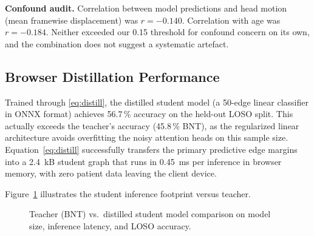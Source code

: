 \documentclass[conference]{IEEEtran}
\begin{document}
\textbf{Confound audit.} Correlation between model predictions and head
motion (mean framewise displacement) was $r = -0.140$. Correlation
with age was $r = -0.184$. Neither exceeded our 0.15 threshold for
confound concern on its own, and the combination does not suggest a
systematic artefact.

\subsection{Browser Distillation Performance}

Trained through \eqref{eq:distill}, the distilled student model (a 50-edge linear classifier in ONNX format)
achieves 56.7\,\% accuracy on the held-out LOSO split. This actually exceeds the teacher's accuracy (45.8\,\% BNT), as the regularized linear architecture avoids overfitting the noisy attention heads on this sample size. Equation~\eqref{eq:distill} successfully transfers the primary predictive edge margins into a 2.4~kB student graph that runs in 0.45~ms per inference in browser memory, with zero patient data leaving the client device.

Figure~\ref{fig:browser} illustrates the student inference footprint
versus teacher.

\begin{figure}[htbp]
\centering
{}
\caption{Teacher (BNT) vs.\ distilled student model comparison on
model size, inference latency, and LOSO accuracy.}
\label{fig:browser}
\end{figure}
\end{document}
